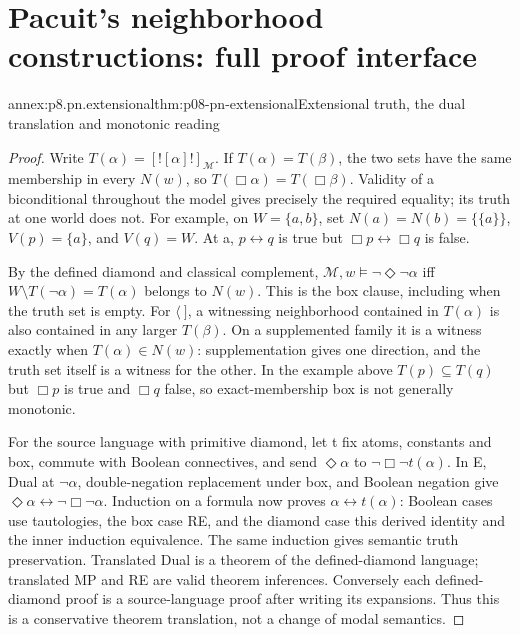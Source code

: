 \section{Pacuit's neighborhood constructions: full proof interface}

\begin{annexitem}{annex:p8.pn.extensional}{thm:p08-pn-extensional}{Extensional truth, the dual translation and monotonic reading}
\begin{proof}
Write \(T(\alpha)=[![\alpha]!]_{\mathcal M}\). If
\(T(\alpha)=T(\beta)\), the two sets have the same membership
in every \(N(w)\), so \(T(\Box\alpha)=T(\Box\beta)\).
Validity of a biconditional throughout the model gives precisely
the required equality; its truth at one world does not. For example,
on \(W=\{a,b\}\), set \(N(a)=N(b)=\{\{a\}\}\),
\(V(p)=\{a\}\), and \(V(q)=W\). At a, \(p\leftrightarrow q\)
is true but \(\Box p\leftrightarrow\Box q\) is false.

By the defined diamond and classical complement,
\(\mathcal M,w\models\neg\Diamond\neg\alpha\) iff
\(W\setminus T(\neg\alpha)=T(\alpha)\) belongs to \(N(w)\).
This is the box clause, including when the truth set is empty.
For \(\langle\ ]\), a witnessing neighborhood contained in
\(T(\alpha)\) is also contained in any larger \(T(\beta)\).
On a supplemented family it is a witness exactly when
\(T(\alpha)\in N(w)\): supplementation gives one direction,
and the truth set itself is a witness for the other. In the example
above \(T(p)\subseteq T(q)\) but \(\Box p\) is true and
\(\Box q\) false, so exact-membership box is not generally monotonic.

For the source language with primitive diamond, let t fix atoms,
constants and box, commute with Boolean connectives, and send
\(\Diamond\alpha\) to \(\neg\Box\neg t(\alpha)\).
In E, Dual at \(\neg\alpha\), double-negation replacement under
box, and Boolean negation give
\(\Diamond\alpha\leftrightarrow\neg\Box\neg\alpha\).
Induction on a formula now proves \(\alpha\leftrightarrow t(\alpha)\):
Boolean cases use tautologies, the box case RE, and the diamond case
this derived identity and the inner induction equivalence. The same
induction gives semantic truth preservation. Translated Dual is a
theorem of the defined-diamond language; translated MP and RE are
valid theorem inferences. Conversely each defined-diamond proof is
a source-language proof after writing its expansions. Thus this is
a conservative theorem translation, not a change of modal semantics.
\end{proof}
\end{annexitem}

